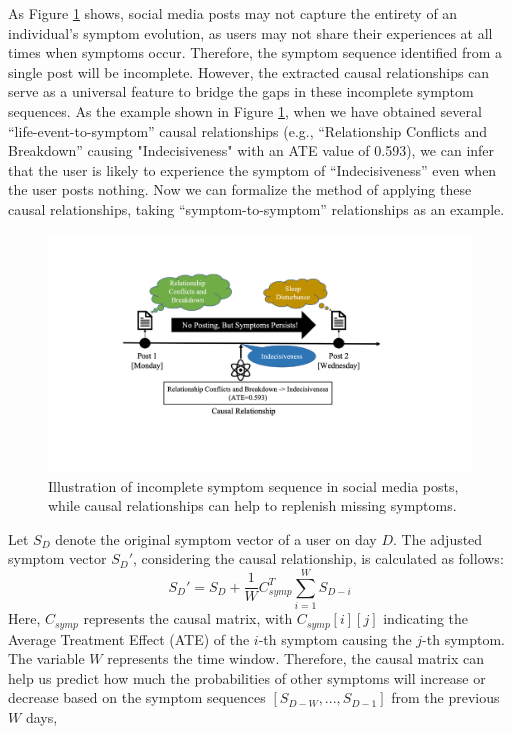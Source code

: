 As Figure \ref{fig:causal_apply} shows, social media posts may not capture the entirety of an individual's symptom evolution, as users may not share their experiences at all times when symptoms occur. Therefore, the symptom sequence identified from a single post will be incomplete. However, the extracted causal relationships can serve as a universal feature to bridge the gaps in these incomplete symptom sequences. As the example shown in Figure \ref{fig:causal_apply}, when we have obtained several ``life-event-to-symptom'' causal relationships (e.g., ``Relationship Conflicts and Breakdown'' causing "Indecisiveness" with an ATE value of 0.593), we can infer that the user is likely to experience the symptom of ``Indecisiveness'' even when the user posts nothing.
Now we can formalize the method of applying these causal relationships, taking ``symptom-to-symptom'' relationships as an example.  
\begin{figure}[th]
	\centering
	\includegraphics[width=\linewidth]{figures/causal_apply.pdf}
	\caption{Illustration of incomplete symptom sequence in social media posts, while causal relationships can help to replenish missing symptoms.}
	\label{fig:causal_apply}
\end{figure}



Let $S_D$ denote the original symptom vector of a user on day $D$. The adjusted symptom vector $S_D'$, considering the causal relationship, is calculated as follows:
\begin{equation}
    S_D'=S_D+ \frac{1}{W}C_{symp}^T\sum_{i=1}^W S_{D-i}
\end{equation}
Here, $C_{symp}$ represents the causal matrix, with $C_{symp}[i][j]$ indicating the Average Treatment Effect (ATE) of the $i$-th symptom causing the $j$-th symptom. The variable $W$ represents the time window. Therefore, the causal matrix can help us predict how much the probabilities of other symptoms will increase or decrease based on the symptom sequences $[S_{D-W}, ..., S_{D-1}]$ from the previous $W$ days, 

